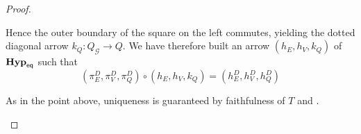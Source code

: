 \documentclass[3p]{elsarticle}
\newcommand{\catname}[1]{\textbf{\textup{#1}}}
\newcommand{\EqHyp}{\catname{Hyp}_{\mathsf{eq}}} %
\theoremstyle{remark}
\theoremstyle{definition}
\begin{document}
\begin{proof}
\begin{enumerate}
\noindent 
\begin{minipage}[l]{.3\linewidth}
\end{minipage}
\hfill
\begin{minipage}[r]{.75\linewidth}
Hence the  outer boundary of the square on the left commutes, yielding the dotted diagonal arrow $k_Q\colon Q_\mathcal{G}\to Q$.  We have therefore built an arrow $(h_E, h_V, k_Q)$ of $\EqHyp$ such that
\vspace{-.2cm}
\[(\pi^D_E, \pi^D_V, \pi^D_Q)\circ (h_E, h_V, k_Q)=(h^D_E, h^D_V, h^D_Q)\]
\end{minipage}

\smallskip 
As in the point above, uniqueness is guaranteed by faithfulness of $T$ and .	\qedhere 
	\end{enumerate}
\end{proof}

\mn*
\end{document}
